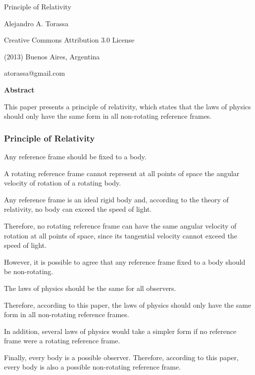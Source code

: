 \documentclass[10pt]{article}
\begin{document}
\begin{center}

{\LARGE Principle of Relativity}

\bigskip \medskip

Alejandro A. Torassa

\bigskip \medskip

\footnotesize

Creative Commons Attribution 3.0 License

(2013) Buenos Aires, Argentina

atorassa@gmail.com

\bigskip \smallskip

\small

{\bf Abstract}

\bigskip

\parbox{75mm}{This paper presents a principle of relativity, which states that the laws of physics should only have the same form in all non-rotating reference frames.}

\end{center}

\normalsize

\vspace{-0.45em}

{\centering\subsubsection*{Principle of Relativity}}

\vspace{+0.75em}

\par Any reference frame should be fixed to a body.
\medskip
\par A rotating reference frame cannot represent at all points of space the angular velocity of rotation of a rotating body.
\medskip
\par Any reference frame is an ideal rigid body and, according to the theory of relativity, no body can exceed the speed of light.
\medskip
\par Therefore, no rotating reference frame can have the same angular velocity of rotation at all points of space, since its tangential velocity cannot exceed the speed of light.
\medskip
\par However, it is possible to agree that any reference frame fixed to a body should be non-rotating.
\medskip
\par The laws of physics should be the same for all observers.
\medskip
\par Therefore, according to this paper, the laws of physics should only have the same form in all non-rotating reference frames.
\medskip
\par In addition, several laws of physics would take a simpler form if no reference frame were a rotating reference frame.
\medskip
\par Finally, every body is a possible observer. Therefore, according to this paper, every body is also a possible non-rotating reference frame.
\end{document}
